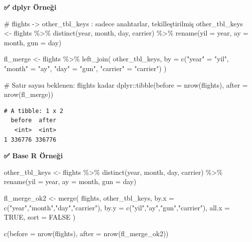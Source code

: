 \documentclass[
  letterpaper,
  DIV=11,
  numbers=noendperiod]{scrreprt}
\newenvironment{Shaded}{\begin{snugshade}}{\end{snugshade}}
\newcommand{\AttributeTok}[1]{\textcolor[rgb]{0.40,0.45,0.13}{#1}}
\newcommand{\CommentTok}[1]{\textcolor[rgb]{0.37,0.37,0.37}{#1}}
\newcommand{\ConstantTok}[1]{\textcolor[rgb]{0.56,0.35,0.01}{#1}}
\newcommand{\FunctionTok}[1]{\textcolor[rgb]{0.28,0.35,0.67}{#1}}
\newcommand{\NormalTok}[1]{\textcolor[rgb]{0.00,0.23,0.31}{#1}}
\newcommand{\OtherTok}[1]{\textcolor[rgb]{0.00,0.23,0.31}{#1}}
\newcommand{\SpecialCharTok}[1]{\textcolor[rgb]{0.37,0.37,0.37}{#1}}
\newcommand{\StringTok}[1]{\textcolor[rgb]{0.13,0.47,0.30}{#1}}
\begin{document}
\textbf{✅ dplyr Örneği}

\begin{Shaded}
\begin{Highlighting}[]
\CommentTok{\# flights {-}\textgreater{} other\_tbl\_keys : sadece anahtarlar, tekilleştirilmiş}
\NormalTok{other\_tbl\_keys }\OtherTok{\textless{}{-}}\NormalTok{ flights }\SpecialCharTok{\%\textgreater{}\%}
  \FunctionTok{distinct}\NormalTok{(year, month, day, carrier) }\SpecialCharTok{\%\textgreater{}\%}
  \FunctionTok{rename}\NormalTok{(}\AttributeTok{yil =}\NormalTok{ year, }\AttributeTok{ay =}\NormalTok{ month, }\AttributeTok{gun =}\NormalTok{ day)}

\NormalTok{fl\_merge }\OtherTok{\textless{}{-}}\NormalTok{ flights }\SpecialCharTok{\%\textgreater{}\%}
  \FunctionTok{left\_join}\NormalTok{(}
\NormalTok{    other\_tbl\_keys,}
    \AttributeTok{by =} \FunctionTok{c}\NormalTok{(}\StringTok{"year"} \OtherTok{=} \StringTok{"yil"}\NormalTok{, }\StringTok{"month"} \OtherTok{=} \StringTok{"ay"}\NormalTok{, }\StringTok{"day"} \OtherTok{=} \StringTok{"gun"}\NormalTok{, }\StringTok{"carrier"} \OtherTok{=} \StringTok{"carrier"}\NormalTok{)}
\NormalTok{  )}

\CommentTok{\# Satır sayısı beklenen: flights kadar}
\NormalTok{dplyr}\SpecialCharTok{::}\FunctionTok{tibble}\NormalTok{(}\AttributeTok{before =} \FunctionTok{nrow}\NormalTok{(flights), }\AttributeTok{after =} \FunctionTok{nrow}\NormalTok{(fl\_merge))}
\end{Highlighting}
\end{Shaded}

\begin{verbatim}
# A tibble: 1 x 2
  before  after
   <int>  <int>
1 336776 336776
\end{verbatim}

\textbf{✅ Base R Örneği}

\begin{Shaded}
\begin{Highlighting}[]
\NormalTok{other\_tbl\_keys }\OtherTok{\textless{}{-}}\NormalTok{ flights }\SpecialCharTok{\%\textgreater{}\%}
  \FunctionTok{distinct}\NormalTok{(year, month, day, carrier) }\SpecialCharTok{\%\textgreater{}\%}
  \FunctionTok{rename}\NormalTok{(}\AttributeTok{yil =}\NormalTok{ year, }\AttributeTok{ay =}\NormalTok{ month, }\AttributeTok{gun =}\NormalTok{ day)}

\NormalTok{fl\_merge\_ok2 }\OtherTok{\textless{}{-}} \FunctionTok{merge}\NormalTok{(}
\NormalTok{  flights, other\_tbl\_keys,}
  \AttributeTok{by.x =} \FunctionTok{c}\NormalTok{(}\StringTok{"year"}\NormalTok{,}\StringTok{"month"}\NormalTok{,}\StringTok{"day"}\NormalTok{,}\StringTok{"carrier"}\NormalTok{),}
  \AttributeTok{by.y =} \FunctionTok{c}\NormalTok{(}\StringTok{"yil"}\NormalTok{,}\StringTok{"ay"}\NormalTok{,}\StringTok{"gun"}\NormalTok{,}\StringTok{"carrier"}\NormalTok{),}
  \AttributeTok{all.x =} \ConstantTok{TRUE}\NormalTok{,}
  \AttributeTok{sort =} \ConstantTok{FALSE}
\NormalTok{)}

\FunctionTok{c}\NormalTok{(}\AttributeTok{before =} \FunctionTok{nrow}\NormalTok{(flights), }\AttributeTok{after =} \FunctionTok{nrow}\NormalTok{(fl\_merge\_ok2))}
\end{Highlighting}
\end{Shaded}
\end{document}

